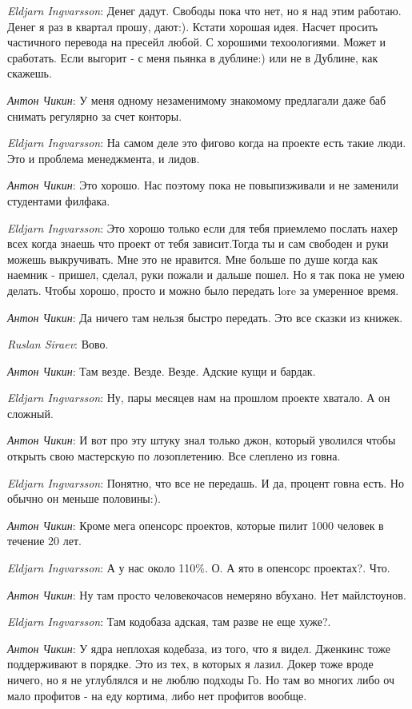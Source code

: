 \documentclass[10pt]{book}
\newcommand{\AUTHOR}[1]{\emph{#1}:}
\begin{document}
\AUTHOR{Eldjarn Ingvarsson} Денег дадут. Свободы пока что нет, но я над этим работаю. Денег я раз в квартал прошу, дают:). Кстати хорошая идея. Насчет просить частичного перевода на пресейл любой. С хорошими техоологиями. Может и сработать. Если выгорит - с меня пьянка в дублине:) или не в Дублине, как скажешь.

\AUTHOR{Антон Чикин} У меня одному незаменимому знакомому предлагали даже баб снимать регулярно за счет конторы.

\AUTHOR{Eldjarn Ingvarsson} На самом деле это фигово когда на проекте есть такие люди. Это и проблема менеджмента, и лидов.

\AUTHOR{Антон Чикин} Это хорошо. Нас поэтому пока не повыпизживали и не заменили студентами филфака.

\AUTHOR{Eldjarn Ingvarsson} Это хорошо только если для тебя приемлемо послать нахер всех когда знаешь что проект от тебя зависит.Тогда ты и сам свободен и руки можешь выкручивать. Мне это не нравится. Мне больше по душе когда как наемник - пришел, сделал, руки пожали и дальше пошел. Но я так пока не умею делать. Чтобы хорошо, просто и можно было передать lore  за умеренное время.

\AUTHOR{Антон Чикин} Да ничего там нельзя быстро передать. Это все сказки из книжек.

\AUTHOR{Ruslan Siraev} Вово.

\AUTHOR{Антон Чикин} Там везде. Везде. Везде. Адские кущи и бардак.

\AUTHOR{Eldjarn Ingvarsson} Ну, пары месяцев нам на прошлом проекте хватало. А он сложный.

\AUTHOR{Антон Чикин} И вот про эту штуку знал только джон, который уволился чтобы открыть свою мастерскую по лозоплетению. Все слеплено из говна.

\AUTHOR{Eldjarn Ingvarsson} Понятно, что все не передашь. И да, процент говна есть. Но обычно он меньше половины:).

\AUTHOR{Антон Чикин} Кроме мега опенсорс проектов, которые пилит 1000 человек в течение 20 лет.

\AUTHOR{Eldjarn Ingvarsson} А у нас около 110\%. О. А ято в опенсорс проектах?. Что.

\AUTHOR{Антон Чикин} Ну там просто человекочасов немеряно вбухано. Нет майлстоунов.

\AUTHOR{Eldjarn Ingvarsson} Там кодобаза адская, там разве не еще хуже?.

\AUTHOR{Антон Чикин} У ядра неплохая кодебаза, из того, что я видел. Дженкинс тоже поддерживают в порядке. Это из тех, в которых я лазил. Докер тоже вроде ничего, но я не углублялся и не люблю подходы Го. Но там во многих либо оч мало профитов - на еду кортима, либо нет профитов вообще.
\end{document}
